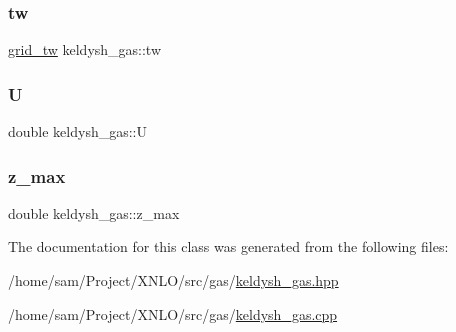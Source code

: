 \mbox{\label{classkeldysh__gas_a1cd7129f9ba9d62f4084049e529cab49}} 
\subsubsection{\texorpdfstring{tw}{tw}}
{\footnotesize\ttfamily \mbox{\hyperlink{classgrid__tw}{grid\+\_\+tw}} keldysh\+\_\+gas\+::tw\hspace{0.3cm}{\ttfamily [private]}}

\mbox{\label{classkeldysh__gas_a752b70afe289a798cc0ab7b688b9ed3d}} 
\subsubsection{\texorpdfstring{U}{U}}
{\footnotesize\ttfamily double keldysh\+\_\+gas\+::U}

\mbox{\label{classkeldysh__gas_a117691dd8b6fd06b34a73392c0e73e32}} 
\subsubsection{\texorpdfstring{z\_max}{z\_max}}
{\footnotesize\ttfamily double keldysh\+\_\+gas\+::z\+\_\+max}



The documentation for this class was generated from the following files\+:\begin{DoxyCompactItemize}
\item 
/home/sam/\+Project/\+X\+N\+L\+O/src/gas/\mbox{\hyperlink{keldysh__gas_8hpp}{keldysh\+\_\+gas.\+hpp}}\item 
/home/sam/\+Project/\+X\+N\+L\+O/src/gas/\mbox{\hyperlink{keldysh__gas_8cpp}{keldysh\+\_\+gas.\+cpp}}\end{DoxyCompactItemize}
